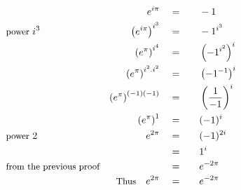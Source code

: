 \begin{alignat*}{5}
&\,&e^{i\pi}\quad&=\quad&&-1\\
&\small\text{power }i^3&\left(e^{i\pi}\right)^{i^3}\quad&=&&-1^{i^3}\\
&\,&\left(e^\pi\right)^{i^4}\quad&=&&\left(-1^{i^2}\right)^i\\
&\,&\left(e^\pi\right)^{i^2.i^2}\quad&=&&\left(-1^{-1}\right)^i\\
&\,&\left(e^\pi\right)^{(-1)(-1)}\quad&=&&\left(\frac{1}{-1}\right)^i\\
&\,&\left(e^\pi\right)^1\quad&=&&(-1)^i\\
&\small\text{power }2&e^{2\pi}\quad&=&&(-1)^{2i}\\
&\,&\,&=&&1^i\\
&\small\text{from the previous proof}&\,&=&&e^{-2\pi}\\
&\,&\small\text{Thus}\normalsize\quad e^{2\pi}\quad&=&&e^{-2\pi}
\end{alignat*}
